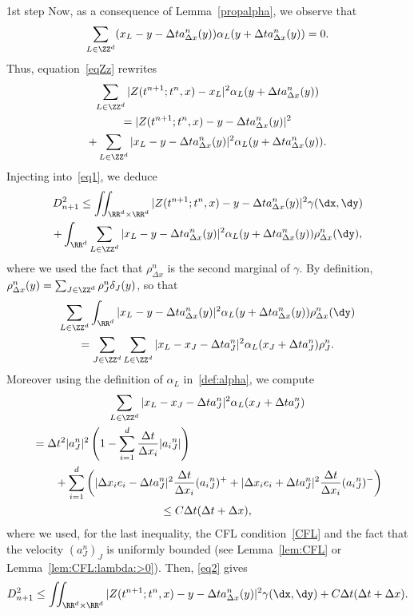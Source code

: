 \begin{step}{1st step}
Now, as a consequence of Lemma~\ref{propalpha}, we observe that
\[
\sum_{L\in \ZZ^d} (x_L-y-\Delta t a^n_{\Delta x}(y)) \alpha_L(y+\Delta t a^n_{\Delta x}(y)) = 0.
\]
Thus, equation~\eqref{eqZz} rewrites
\begin{multline*}
\sum_{L\in \ZZ^d}|Z(t^{n+1};t^n,x) - x_L|^2 \alpha_L(y+\Delta t a^n_{\Delta x}(y))\\
= |Z(t^{n+1};t^n,x)-y-\Delta t a^n_{\Delta x}(y)|^2
\\
+ \sum_{L\in \ZZ^d} |x_L-y-\Delta t a^n_{\Delta x}(y)|^2 \alpha_L(y+\Delta t a^n_{\Delta x}(y)).
\end{multline*}
Injecting into~\eqref{eq1}, we deduce
\begin{multline}
D_{n+1}^2 \leq \iint_{\RR^d\times\RR^d} |Z(t^{n+1};t^n,x)-y-\Delta t a^n_{\Delta x}(y)|^2 \gamma(\dx,\dy)\\
+ \int_{\RR^d} \sum_{L\in \ZZ^d} |x_L-y-\Delta t a^n_{\Delta x}(y) |^2 \alpha_L(y+\Delta t a^n_{\Delta x}(y)) \rho_{\Delta x}^n(\dy), \label{eq2}
\end{multline}
where we used the fact that $\rho_{\Delta x}^n$ is the second marginal of $\gamma$. By definition, $\rho_{\Delta x}^n(y) = \sum_{J\in\ZZ^d} \rho_J^n \delta_J(y)$, so that
\begin{multline*}
\sum_{L\in \ZZ^d} \int_{\RR^d} |x_L-y-\Delta t a^n_{\Delta x}(y)|^2 \alpha_L(y+\Delta t a^n_{\Delta x}(y)) \rho_{\Delta x}^n(\dy) \\
= \sum_{J\in \ZZ^d} \sum_{L\in \ZZ^d} |x_L-x_J-\Delta t a^n_J|^2 \alpha_L(x_J+\Delta t a^n_J) \rho_J^n.
\end{multline*}
Moreover using the definition of $\alpha_L$ in~\eqref{def:alpha}, we compute
\begin{multline*}
\sum_{L\in \ZZ^d} |x_L-x_J-\Delta t a^n_J|^2 \alpha_L(x_J+\Delta t a^n_J)\\
\begin{aligned}
&= \Delta t^2 |a_J^n|^2 \left(1-\sum_{i=1}^d \frac{\Delta t}{\Delta x_i} |{a_i}_J^n|\right) \\
&\qquad+ \sum_{i=1}^d \left(|\Delta x_i e_i -\Delta t a^n_J|^2 \frac{\Delta t}{\Delta x_i} ({a_i}_J^n)^+ +
|\Delta x_i e_i +\Delta t a^n_J|^2 \frac{\Delta t}{\Delta x_i} ({a_i}_J^n)^- \right)
\end{aligned}\\
\leq C\Delta t(\Delta t + \Delta x),
\end{multline*}
where we used, for the last inequality, the CFL condition~\eqref{CFL} and the fact that the velocity $(a_J^n)_J$ is uniformly bounded (see Lemma~\ref{lem:CFL} or Lemma~\ref{lem:CFL:lambda:>0}). Then, \eqref{eq2} gives
\begin{equation}\label{eqD1}
D_{n+1}^2 \leq \iint_{\RR^d\times\RR^d} |Z(t^{n+1};t^n,x)-y-\Delta t a^n_{\Delta x}(y)|^2 \gamma(\dx,\dy) + C \Delta t (\Delta t+\Delta x).
\end{equation}
\end{step}

